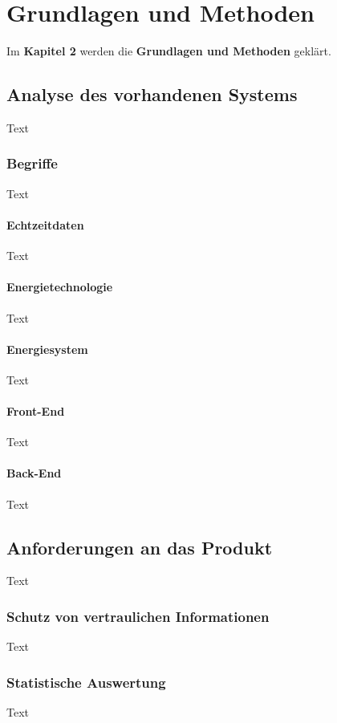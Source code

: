 \chapter{Grundlagen und Methoden}
Im \textbf{Kapitel 2} werden die \textbf{Grundlagen und Methoden} geklärt.


\section{Analyse des vorhandenen Systems}
Text

\subsection{Begriffe}
Text

\subsubsection{Echtzeitdaten}
Text

\subsubsection{Energietechnologie}
Text
\subsubsection{Energiesystem}
Text
\subsubsection{Front-End}
Text
\subsubsection{Back-End}
Text








\section{Anforderungen an das Produkt}
Text

\subsection{Schutz von vertraulichen Informationen}
Text

\subsection{Statistische Auswertung}
Text
